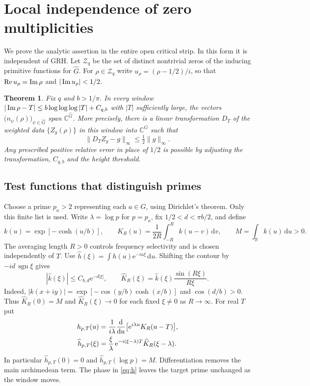 \documentclass[11pt,letterpaper]{article}
\newtheorem{theorem}{Theorem}\newtheorem{corollary}[theorem]{Corollary}
\newcommand{\C}{\mathbb C}\newcommand{\R}{\mathbb R}\newcommand{\Z}{\mathbb Z}
\newcommand{\re}{\operatorname{Re}}\newcommand{\e}{\mathrm e}\newcommand{\dd}{\,\mathrm d}
\newcommand{\wt}{\widehat}\newcommand{\one}{\mathbf 1}
\begin{document}
\section{Local independence of zero multiplicities}
We prove the analytic assertion in the entire open critical strip. In this form it is independent of GRH. Let $\mathcal Z_q$ be the set of distinct nontrivial zeros of the inducing primitive functions for $\widehat G$. For $\rho\in\mathcal Z_q$ write $u_\rho=(\rho-1/2)/i$, so that $\re u_\rho=\imag\rho$ and $|\operatorname{Im} u_\rho|<1/2$.

\begin{theorem}\label{thm:local}
Fix $q$ and $b>1/\pi$. In every window $|\operatorname{Im}\rho-T|\le b\log\log\log|T|+C_{q,b}$ with $|T|$ sufficiently large, the vectors
$\bigl(n_\psi(\rho)\bigr)_{\psi\in\widehat G}$ span $\C^{\widehat G}$. More precisely, there is a linear transformation $D_T$ of the weighted data $\{Z_g(\rho)\}$ in this window into $\C^G$ such that
\begin{equation}
 \|D_T Z_g-g\|_\infty\le\tfrac12\|g\|_\infty .
 \label{eq:norm}
\end{equation}
Any prescribed positive relative error in place of $1/2$ is possible by adjusting the transformation, $C_{q,b}$ and the height threshold.
\end{theorem}

\subsection*{Test functions that distinguish primes}
Choose a prime $p_a>2$ representing each $a\in G$, using Dirichlet's theorem. Only this finite list is used. Write $\lambda=\log p$ for $p=p_a$, fix $1/2<d<\pi b/2$, and define
\[
  k(u)=\exp[-\cosh(u/b)],\qquad
  K_R(u)=\frac1{2R}\int_{-R}^{R}k(u-v)\dd v,\qquad
  M=\int_{\R}k(u)\dd u>0.
\]
The averaging length $R>0$ controls frequency selectivity and is chosen independently of $T$. Use $\wt h(\xi)=\int h(u)\e^{-iu\xi}\dd u$. Shifting the contour by $-i d\,\operatorname{sgn}\xi$ gives
\begin{equation}
 |\wt k(\xi)|\le C_{b,d}\e^{-d|\xi|},\qquad
 \wt K_R(\xi)=\wt k(\xi)\frac{\sin(R\xi)}{R\xi}.
 \label{eq:ft}
\end{equation}
Indeed, $|k(x+iy)|=\exp[-\cos(y/b)\cosh(x/b)]$ and $\cos(d/b)>0$. Thus $\wt K_R(0)=M$ and $\wt K_R(\xi)\to0$ for each fixed $\xi\ne0$ as $R\to\infty$. For real $T$ put
\begin{align}
 h_{p,T}(u)&=\frac1{i\lambda}\frac{\mathrm d}{\mathrm du}
       \bigl[\e^{i\lambda u}K_R(u-T)\bigr],\notag\\
 \wt h_{p,T}(\xi)&=\frac{\xi}{\lambda}\,
        \e^{-i(\xi-\lambda)T}\wt K_R(\xi-\lambda).
 \label{eq:h}
\end{align}
In particular $\wt h_{p,T}(0)=0$ and $\wt h_{p,T}(\log p)=M$. Differentiation removes the main archimedean term. The phase in \eqref{eq:h} leaves the target prime unchanged as the window moves.
\end{document}
